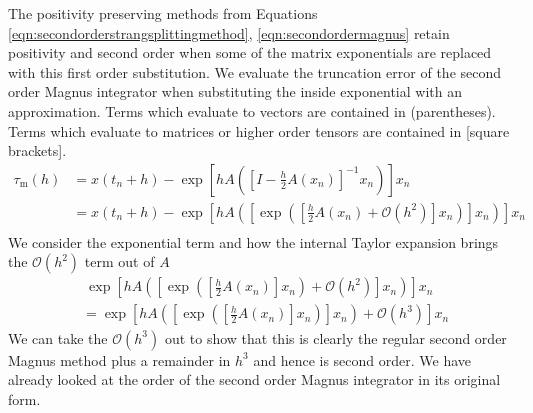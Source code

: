 The positivity preserving methods from Equations \ref{eqn:secondorderstrangsplittingmethod}, \ref{eqn:secondordermagnus} retain positivity and second order when some of the matrix exponentials are replaced with this first order substitution.
We evaluate the truncation error of the second order Magnus integrator when substituting the inside exponential with an approximation.
Terms which evaluate to vectors are contained in (parentheses). Terms which evaluate to matrices or higher order tensors are contained in [square brackets].
\begin{equation*}
    \begin{aligned}
        \tau_\mathrm{m}(h) &= x(t_n + h) - \exp \left[
            h A \left(
                \left[
                    I - \frac{h}{2}A(x_n)
                \right]^{-1} x_n
            \right)
        \right]x_n \\
        &= x(t_n + h) - \exp \left[
            h A \left(
                \left[
                    \exp \left(
                        \left[
                            \frac{h}{2}A(x_n) + \mathcal{O}(h^2)
                        \right] x_n
                    \right)
                \right] x_n
            \right)
        \right]x_n \\
    \end{aligned}
\end{equation*}
We consider the exponential term and how the internal Taylor expansion brings the $\mathcal{O}(h^2)$ term out of $A$
\begin{equation*}
    \begin{aligned}
        &~ \exp \left[
            h A \left(
                \left[
                    \exp \left(
                        \left[
                            \frac{h}{2}A(x_n)
                        \right] x_n
                    \right) + \mathcal{O}(h^2)
                \right] x_n
            \right)
        \right]x_n \\
        &= \exp \left[
            h A \left(
                \left[
                    \exp \left(
                        \left[
                            \frac{h}{2}A(x_n)
                        \right] x_n
                    \right)
                \right] x_n
            \right) + \mathcal{O}(h^3)
        \right]x_n
    \end{aligned}
\end{equation*}
We can take the $\mathcal{O}(h^3)$ out to show that this is clearly the regular second order Magnus method plus a remainder in $h^3$ and hence is second order.
We have already looked at the order of the second order Magnus integrator in its original form. 

